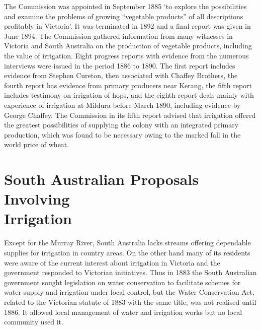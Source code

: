 The Commission was appointed in September 1885 `to explore the
possibilities and examine the problems of growing ``vegetable
products'' of all descriptions profitably in Victoria'.  It was
terminated in 1892 and a final report was given in June 1894.  The
Commission gathered information from many witnesses in Victoria and
South Australia on the production of vegetable products, including the
value of irrigation.  Eight progress reports with evidence from the
numerous interviews were issued in the period 1886 to 1890.  The first
report includes evidence from Stephen Cureton, 
then associated with Chaffey Brothers,  the fourth
report has evidence from primary producers near Kerang, the fifth
report includes testimony on irrigation of hops, and the eighth report
deals mainly with experience of irrigation at Mildura   before March 1890, including evidence by George
Chaffey.   The Commission in its fifth report
advised that irrigation offered the greatest possibilities of
supplying the colony with an integrated primary production, which was
found to be necessary owing to the marked fall in the world price of
wheat.

\section*{South Australian Proposals Involving\\
 Irrigation}

Except for the Murray River, South Australia lacks streams offering
dependable supplies for irrigation in country areas.  On the other
hand many of its residents were aware of the current interest about
irrigation in Victoria and the government responded to Victorian
initiatives.  Thus in 1883 the South Australian government sought
legislation on water conservation to facilitate schemes for water
supply and irrigation under local control, but the Water Conservation
Act,  related to the
Victorian statute of 1883 with the same title, was not realised until
1886.  It allowed local management of water and irrigation works but
no local community used it.

